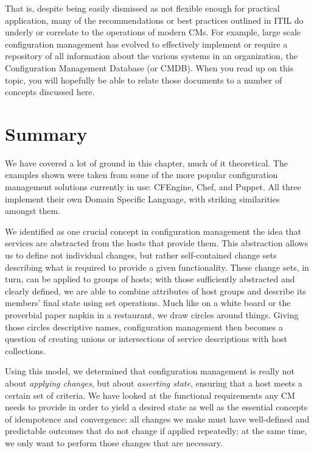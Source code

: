 That is, despite being easily dismissed as not
flexible enough for practical application, many of the
recommendations or best practices outlined in ITIL do
underly or correlate to the operations of modern CMs.
For example, large scale configuration management has
evolved to effectively implement or require a
repository of all information about the various
systems in an organization, the Configuration
Management Database (or CMDB).  When you read up on this topic,
you will hopefully be able to relate those documents
to a number of concepts discussed here.




\section{Summary}
\label{configuration-management:summary}

We have covered a lot of ground in this chapter, much
of it theoretical.  The examples shown were taken from
some of the more popular configuration management solutions
currently in use: CFEngine, Chef, and Puppet.  All
three implement their own Domain Specific Language,
with striking similarities amongst them.

We identified as one crucial concept in configuration
management the idea that services are abstracted from
the hosts that provide them.  This abstraction allows
us to define not individual changes, but rather
self-contained change sets describing what is required
to provide a given functionality.  These change sets,
in turn, can be applied to groups of hosts; with those
sufficiently abstracted and clearly defined, we are
able to combine attributes of host groups and describe
its members' final state using set operations.  Much
like on a white board or the proverbial paper napkin
in a restaurant, we draw circles around things.
Giving those circles descriptive names, configuration
management then becomes a question of creating unions
or intersections of service descriptions with host
collections.

Using this model, we determined that configuration
management is really not about {\em applying changes},
but about {\em asserting state}, ensuring that a host
meets a certain set of criteria.  We have looked at
the functional requirements any CM needs to provide in
order to yield a desired state as well as the
essential concepts of idempotence and convergence: all
changes we make must have well-defined and predictable
outcomes that do not change if applied repeatedly; at
the same time, we only want to perform those changes
that are necessary.

